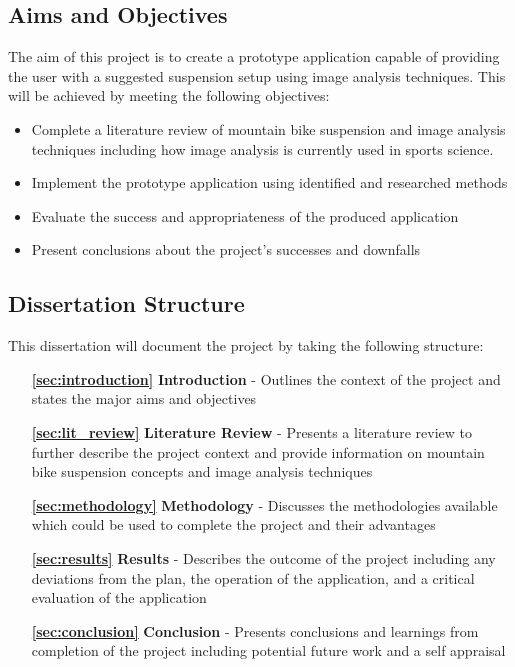 \subsection{Aims and Objectives}
	The aim of this project is to create a prototype application capable of providing the user with a suggested suspension setup using image analysis techniques. This will be achieved by meeting the following objectives:
	\begin{itemize}
		\item Complete a literature review of mountain bike suspension and image analysis techniques including how image analysis is currently used in sports science.
		\item Implement the prototype application using identified and researched methods
		\item Evaluate the success and appropriateness of the produced application
		\item Present conclusions about the project's successes and downfalls
	\end{itemize}
\subsection{Dissertation Structure}
	This dissertation will document the project by taking the following structure:
	\begin{itemize}
		\item[\bfseries \ref{sec:introduction}] {\bfseries Introduction} - Outlines the context of the project and states the major aims and objectives
		\item[\bfseries \ref{sec:lit_review}]{\bfseries Literature Review} - Presents a literature review to further describe the project context and provide information on mountain bike suspension concepts and image analysis techniques
		\item[\bfseries \ref{sec:methodology}] {\bfseries Methodology} - Discusses the methodologies available which could be used to complete the project and their advantages
		\item[\bfseries \ref{sec:results}] {\bfseries Results} - Describes the outcome of the project including any deviations from the plan, the operation of the application, and a critical evaluation of the application
		\item[\bfseries \ref{sec:conclusion}] {\bfseries Conclusion} - Presents conclusions and learnings from completion of the project including potential future work and a self appraisal
	\end{itemize}
	